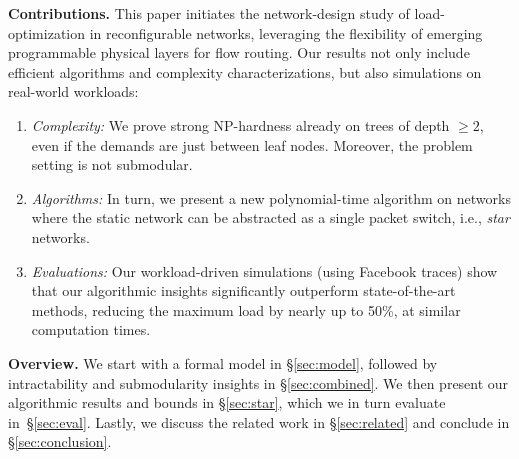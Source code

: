 \documentclass[sigconf]{acmart}
\begin{document}
\smallskip
\noindent\textbf{Contributions.}
This paper initiates the network-design study of load-optimization in reconfigurable networks, leveraging the flexibility of emerging programmable physical layers for flow routing.
%
Our results not only include efficient algorithms and complexity characterizations, but also simulations on real-world workloads:
\begin{enumerate}
    \item \emph{Complexity:} We prove strong NP-hardness already on trees of depth $\geq 2$, even if the demands are just between leaf nodes. Moreover, the problem setting is not submodular.
    \item \emph{Algorithms:} In turn, we present a new polynomial-time algorithm on networks where the static network can be abstracted as a single packet switch, i.e., \emph{star} networks. 
    \item \emph{Evaluations:} Our workload-driven simulations (using Facebook traces) show that our algorithmic insights significantly outperform state-of-the-art methods, reducing the maximum load by nearly up to 50\%, at similar computation times.
\end{enumerate}

%
\noindent\textbf{Overview.}
We start with a formal model in \S\ref{sec:model}, followed by intractability  and submodularity insights in \S\ref{sec:combined}. 
%
We then present our algorithmic results and bounds in \S\ref{sec:star}, which we in turn evaluate in~\S\ref{sec:eval}.
%
Lastly, we discuss the related work in \S\ref{sec:related} and conclude in \S\ref{sec:conclusion}.
\end{document}
